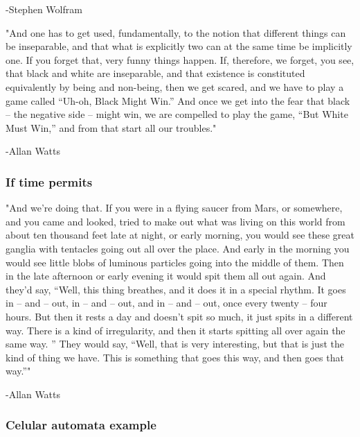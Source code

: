\documentclass[11pt]{article}
\begin{document}
-Stephen Wolfram


"And one has to get used, fundamentally, to the notion that different
things can be inseparable, and that what is explicitly two can at the
same time be implicitly one. If you forget that, very funny things
happen. If, therefore, we forget, you see, that black and white are
inseparable, and that existence is constituted equivalently by being
and non-being, then we get scared, and we have to play a game called
“Uh-oh, Black Might Win.” And once we get into the fear that black –
the negative side – might win, we are compelled to play the game, “But
White Must Win,” and from that start all our troubles."

-Allan Watts

\subsubsection{If time permits}
\label{sec:org1ea9469}

"And we’re doing that. If you were in a flying saucer from Mars, or
somewhere, and you came and looked, tried to make out what was living
on this world from about ten thousand feet late at night, or early
morning, you would see these great ganglia with tentacles going out
all over the place. And early in the morning you would see little
blobs of luminous particles going into the middle of them. Then in the
late afternoon or early evening it would spit them all out again. And
they’d say, “Well, this thing breathes, and it does it in a special
rhythm. It goes in – and – out, in – and – out, and in – and – out,
once every twenty – four hours. But then it rests a day and doesn’t
spit so much, it just spits in a different way. There is a kind of
irregularity, and then it starts spitting all over again the same
way. ” They would say, “Well, that is very interesting, but that is
just the kind of thing we have. This is something that goes this way,
and then goes that way.”"

-Allan Watts

\subsubsection{Celular automata example}
\label{sec:org05c5d60}
\end{document}
